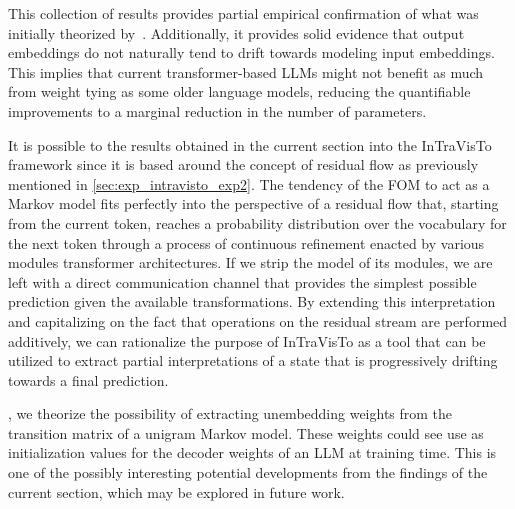 This collection of results provides partial empirical confirmation of what was initially theorized by~\citet{elhage2021}.
Additionally, it provides solid evidence that output embeddings do not naturally tend to drift towards modeling input embeddings.
This implies that current transformer-based LLMs might not benefit as much from weight tying as some older language models, reducing the quantifiable improvements to a marginal reduction in the number of parameters.

It is possible to  the results obtained in the current section into the InTraVisTo framework since it is based around the concept of residual flow as previously mentioned in \cref{sec:exp_intravisto_exp2}.
The tendency of the FOM to act as a Markov model fits perfectly into the perspective of a residual flow that, starting from the current token, reaches a probability distribution over the vocabulary for the next token through a process of continuous refinement enacted by various modules  transformer architectures.
If we strip the model of its modules, we are left with a direct communication channel that provides the simplest possible prediction given the available transformations.
By extending this interpretation and capitalizing on the fact that operations on the residual stream are performed additively, we can rationalize the purpose of InTraVisTo as a tool that can be utilized to extract partial interpretations of a state that is progressively drifting towards a final prediction.

, we theorize the possibility of extracting unembedding weights from the transition matrix of a unigram Markov model.
These weights could see use as initialization values for the decoder weights of an LLM at training time.
This is one of the possibly interesting potential developments  from the findings of the current section, which may be explored in future work.
